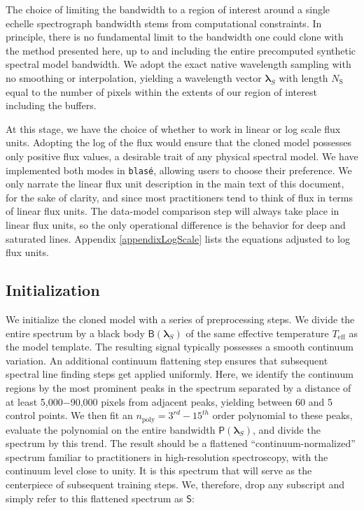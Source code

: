 \documentclass[modern]{aastex631}
\begin{document}
The choice of limiting the bandwidth to a region of interest around a single echelle spectrograph bandwidth stems from computational constraints. In principle, there is no fundamental limit to the bandwidth one could clone with the method presented here, up to and including the entire precomputed synthetic spectral model bandwidth. We adopt the exact native wavelength sampling with no smoothing or interpolation, yielding a wavelength vector $\bm{\lambda}_S$ with length $N_\mathrm{S}$ equal to the number of pixels within the extents of our region of interest including the buffers.

At this stage, we have the choice of whether to work in linear or log scale flux units. Adopting the log of the flux would ensure that the cloned model possesses only positive flux values, a desirable trait of any physical spectral model. We have implemented both modes in \texttt{blas\'e}, allowing users to choose their preference.  We only narrate the linear flux unit description in the main text of this document, for the sake of clarity, and since most practitioners tend to think of flux in terms of linear flux units.  The data-model comparison step will always take place in linear flux units, so the only operational difference is the behavior for deep and saturated lines.  Appendix \ref{appendixLogScale} lists the equations adjusted to log flux units.

\subsection{Initialization}

We initialize the cloned model with a series of preprocessing steps. We divide the entire spectrum by a black body $\mathsf{B}(\bm{\lambda}_S)$ of the same effective temperature $T_{\mathrm{eff}}$ as the model template. The resulting signal typically possesses a smooth continuum variation. An additional continuum flattening step ensures that subsequent spectral line finding steps get applied uniformly. Here, we identify the continuum regions by the most prominent peaks in the spectrum separated by a distance of at least 5,000$-$90,000 pixels from adjacent peaks, yielding between 60 and 5 control points. We then fit an $n_{\mathrm{poly}} = 3^{rd}-15^{th}$ order polynomial to these peaks, evaluate the polynomial on the entire bandwidth $\mathsf{P}(\bm{\lambda}_S)$, and divide the spectrum by this trend. The result should be a flattened ``continuum-normalized'' spectrum familiar to practitioners in high-resolution spectroscopy, with the continuum level close to unity.  It is this spectrum that will serve as the centerpiece of subsequent training steps.  We, therefore, drop any subscript and simply refer to this flattened spectrum as $\mathsf{S}$:
\end{document}
